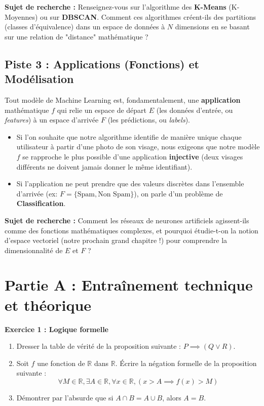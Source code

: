 \documentclass[12pt,a4paper]{report}
\begin{document}
\textbf{Sujet de recherche :} Renseignez-vous sur l'algorithme des \textbf{K-Means} (K-Moyennes) ou sur \textbf{DBSCAN}. Comment ces algorithmes créent-ils des partitions (classes d'équivalence) dans un espace de données à $N$ dimensions en se basant sur une relation de "distance" mathématique ?

\subsection*{Piste 3 : Applications (Fonctions) et Modélisation}
Tout modèle de Machine Learning est, fondamentalement, une \textbf{application} mathématique $f$ qui relie un espace de départ $E$ (les données d'entrée, ou \textit{features}) à un espace d'arrivée $F$ (les prédictions, ou \textit{labels}).
\begin{itemize}
    \item Si l'on souhaite que notre algorithme identifie de manière unique chaque utilisateur à partir d'une photo de son visage, nous exigeons que notre modèle $f$ se rapproche le plus possible d'une application \textbf{injective} (deux visages différents ne doivent jamais donner le même identifiant).
    \item Si l'application ne peut prendre que des valeurs discrètes dans l'ensemble d'arrivée (ex: $F = \{\text{Spam}, \text{Non Spam}\}$), on parle d'un problème de \textbf{Classification}.
\end{itemize}

\textbf{Sujet de recherche :} Comment les réseaux de neurones artificiels agissent-ils comme des fonctions mathématiques complexes, et pourquoi étudie-t-on la notion d'espace vectoriel (notre prochain grand chapitre !) pour comprendre la dimensionnalité de $E$ et $F$ ?

\section*{Partie A : Entraînement technique et théorique}

\textbf{Exercice 1 : Logique formelle}
\begin{enumerate}
    \item Dresser la table de vérité de la proposition suivante : $P \implies (Q \lor R)$.
    \item Soit $f$ une fonction de $\mathbb{R}$ dans $\mathbb{R}$. Écrire la négation formelle de la proposition suivante :
    $$ \forall M \in \mathbb{R}, \exists A \in \mathbb{R}, \forall x \in \mathbb{R}, (x > A \implies f(x) > M) $$
    \item Démontrer par l'absurde que si $A \cap B = A \cup B$, alors $A = B$.
\end{enumerate}
\end{document}
